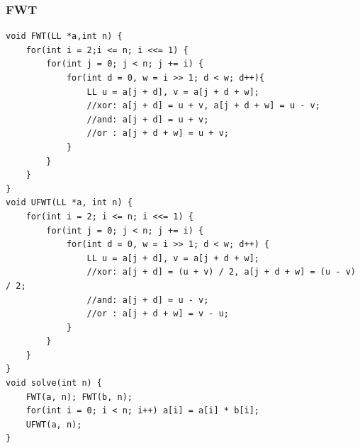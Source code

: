 \documentclass[10pt]{ctexart}
\begin{document}
{\subsubsection{FWT}
\begin{lstlisting}
void FWT(LL *a,int n) {
    for(int i = 2;i <= n; i <<= 1) {
        for(int j = 0; j < n; j += i) {
            for(int d = 0, w = i >> 1; d < w; d++){
                LL u = a[j + d], v = a[j + d + w];
                //xor: a[j + d] = u + v, a[j + d + w] = u - v;
                //and: a[j + d] = u + v;
                //or : a[j + d + w] = u + v;
            }
        }
    }
}
void UFWT(LL *a, int n) {
    for(int i = 2; i <= n; i <<= 1) {
        for(int j = 0; j < n; j += i) {
            for(int d = 0, w = i >> 1; d < w; d++) {
                LL u = a[j + d], v = a[j + d + w];
                //xor: a[j + d] = (u + v) / 2, a[j + d + w] = (u - v) / 2;
                //and: a[j + d] = u - v;
                //or : a[j + d + w] = v - u;
            }
        }
    }
}
void solve(int n) {
    FWT(a, n); FWT(b, n);
    for(int i = 0; i < n; i++) a[i] = a[i] * b[i];
    UFWT(a, n);
}
\end{lstlisting}
}
\end{document}
